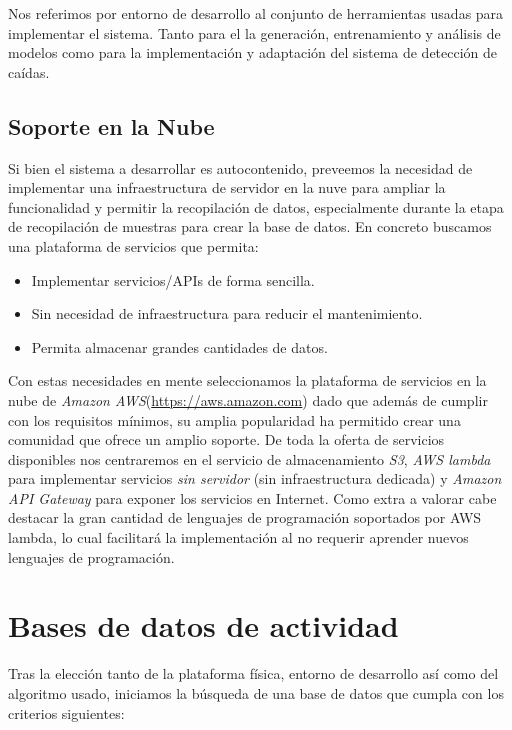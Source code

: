 Nos referimos por entorno de desarrollo al conjunto de herramientas usadas para implementar el sistema. Tanto para el la generación, entrenamiento y análisis de modelos como para la implementación y adaptación del sistema de detección de caídas.



\subsection{Soporte en la Nube}\label{sec:req:nube}

Si bien el sistema a desarrollar es autocontenido, preveemos la necesidad de implementar una infraestructura de servidor en la nuve para ampliar la funcionalidad y permitir la recopilación de datos, especialmente durante la etapa de recopilación de muestras para crear la base de datos. En concreto buscamos una plataforma de servicios que permita:

\begin{itemize}
  \item Implementar servicios/APIs de forma sencilla.
  \item Sin necesidad de infraestructura para reducir el mantenimiento.
  \item Permita almacenar grandes cantidades de datos.
\end{itemize}

Con estas necesidades en mente seleccionamos la plataforma de servicios en la nube de \textit{Amazon AWS}(\url{https://aws.amazon.com}) dado que además de cumplir con los requisitos mínimos, su amplia popularidad ha permitido crear una comunidad que ofrece un amplio soporte. De toda la oferta de servicios disponibles nos centraremos en el servicio de almacenamiento \textit{S3}, \textit{AWS lambda} para implementar servicios \textit{sin servidor} (sin infraestructura dedicada) y \textit{Amazon API Gateway} para exponer los servicios en Internet. Como extra a valorar cabe destacar la gran cantidad de lenguajes de programación soportados por AWS lambda, lo cual facilitará la implementación al no requerir aprender nuevos lenguajes de programación.

\section{Bases de datos de actividad}\label{sec:req:bases:datos}

Tras la elección tanto de la plataforma física, entorno de desarrollo así como del algoritmo usado, iniciamos la búsqueda de una base de datos que cumpla con los criterios siguientes:

